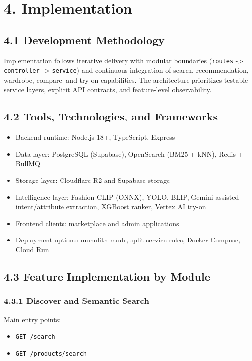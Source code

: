 \documentclass[12pt,a4paper]{report}
\begin{document}
\chapter{4. Implementation}
\section{4.1 Development Methodology}
Implementation follows iterative delivery with modular boundaries (\texttt{routes} -> \texttt{controller} -> \texttt{service}) and continuous integration of search, recommendation, wardrobe, compare, and try-on capabilities. The architecture prioritizes testable service layers, explicit API contracts, and feature-level observability.


\section{4.2 Tools, Technologies, and Frameworks}
\begin{itemize}
\item Backend runtime: Node.js 18+, TypeScript, Express
\item Data layer: PostgreSQL (Supabase), OpenSearch (BM25 + kNN), Redis + BullMQ
\item Storage layer: Cloudflare R2 and Supabase storage
\item Intelligence layer: Fashion-CLIP (ONNX), YOLO, BLIP, Gemini-assisted intent/attribute extraction, XGBoost ranker, Vertex AI try-on
\item Frontend clients: marketplace and admin applications
\item Deployment options: monolith mode, split service roles, Docker Compose, Cloud Run
\end{itemize}

\section{4.3 Feature Implementation by Module}
\subsection{4.3.1 Discover and Semantic Search}
Main entry points:

\begin{itemize}
\item \texttt{GET /search}
\item \texttt{GET /products/search}
\end{itemize}
\end{document}
